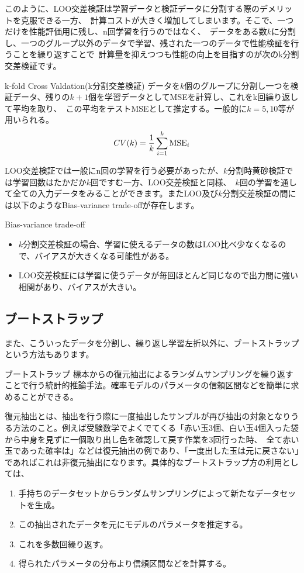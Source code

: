 \documentclass[uplatex]{jsarticle}
\begin{document}
このように、LOO交差検証は学習データと検証データに分割する際のデメリットを克服できる一方、\
計算コストが大きく増加してしまいます。そこで、一つだけを性能評価用に残し、n回学習を行うのではなく、\
データをある数$k$に分割し、一つのグループ以外のデータで学習、残された一つのデータで性能検証を行うことを繰り返すことで\
計算量を抑えつつも性能の向上を目指すのが次のk分割交差検証です。
\begin{itembox}[l]{k-fold Cross Valdation(k分割交差検証)}
  データを$k$個のグループに分割し一つを検証データ、残りの$k+1$個を学習データとしてMSEを計算し、これをk回繰り返して平均を取り、\
  この平均をテストMSEとして推定する。一般的に$k=5, 10$等が用いられる。
  $$CV(k) = \frac{1}{k}\sum_{i=1}^k {\rm MSE}_i$$
\end{itembox}
LOO交差検証では一般にn回の学習を行う必要があったが、$k$分割時黄砂検証では学習回数はたかだか$k$回ですむ一方、LOO交差検証と同様、\
$k$回の学習を通して全ての入力データをみることができます。またLOO及び$k$分割交差検証の間には以下のようなBias-variance trade-offが存在します。
\begin{itembox}[l]{Bias-variance trade-off}
  \begin{itemize}
    \item $k$分割交差検証の場合、学習に使えるデータの数はLOO比べ少なくなるので、バイアスが大きくなる可能性がある。
    \item LOO交差検証には学習に使うデータが毎回ほとんど同じなので出力間に強い相関があり、バイアスが大きい。
  \end{itemize}

\end{itembox}
\subsection{ブートストラップ}
また、こういったデータを分割し、繰り返し学習左折以外に、ブートストラップという方法もあります。
 \begin{itembox}[l]{ブートストラップ}
   標本からの復元抽出によるランダムサンプリングを繰り返すことで行う統計的推論手法。確率モデルのパラメータの信頼区間などを簡単に求めることができる。
 \end{itembox}
 復元抽出とは、抽出を行う際に一度抽出したサンプルが再び抽出の対象となりうる方法のこと。例えば受験数学でよくでてくる「赤い玉3個、白い玉4個入った袋から中身を見ずに一個取り出し色を確認して戻す作業を3回行った時、\
 全て赤い玉であった確率は」などは復元抽出の例であり、「一度出した玉は元に戻さない」であればこれは非復元抽出になります。具体的なブートストラップ方の利用としては、
 \begin{enumerate}
   \item 手持ちのデータセットからランダムサンプリングによって新たなデータセットを生成。
   \item この抽出されたデータを元にモデルのパラメータを推定する。
   \item これを多数回繰り返す。
   \item 得られたパラメータの分布より信頼区間などを計算する。
 \end{enumerate}
\end{document}
